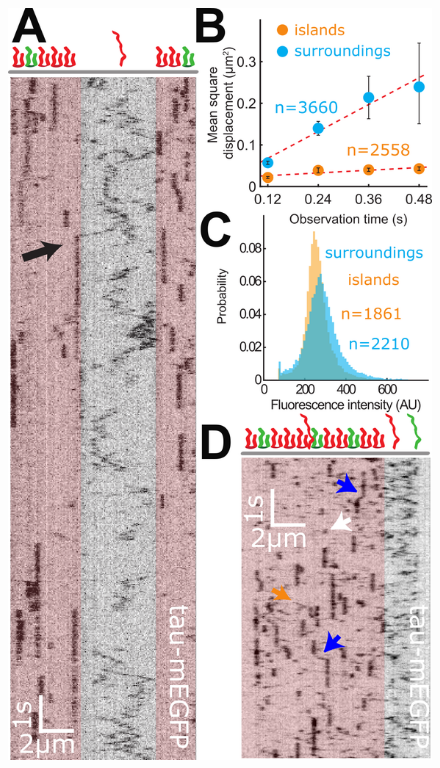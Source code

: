 \begin{figure}
	\centering
	\includegraphics[width=1\linewidth]{Figures/Tau_singleMolecules.png}
	\caption[Tau molecules are stationary within the islands.]{
}
\end{figure}

